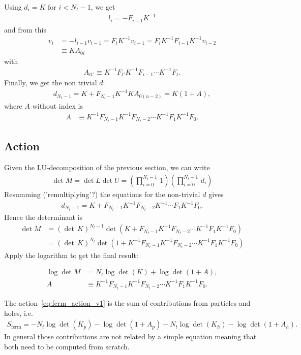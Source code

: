 \documentclass[a4paper, fleqn, twoside, notitlepage]{scrartcl}
\begin{document}
\noindent
Using $d_i = K$ for $i < N_t-1$, we get
\begin{align}
  l_i = - F_{i+1} K^{-1}\label{eq:mlu_l}
\end{align}
and from this
\begin{align}
  v_i &= -l_{i-1}v_{i-1} = F_i K^{-1} v_{i-1} = F_i K^{-1} F_{i-1} K^{-1} v_{i-2}\\
      &\equiv K A_{0i}\label{eq:mlu_v}
\end{align}
with
\begin{align}
  A_{tt'} \equiv K^{-1} F_{t'} K^{-1} F_{i-1} \cdots K^{-1} F_t.\label{eq:def_partial_A}
\end{align}
Finally, we get the non trivial $d$:
\begin{align}
  d_{N_t-1} = K + F_{N_t-1} K^{-1} K A_{0(n-2)} = K (1 + A),
\end{align}
where $A$ without index is
\begin{align}
  A &\equiv K^{-1}F_{N_t-1}K^{-1} F_{N_t-2} \cdots K^{-1}F_{1}K^{-1} F_{0}.\label{eq:def_A}
\end{align}

\subsection{Action}

Given the LU-decomposition of the previous section, we can write
\begin{align}
  \det M = \det L \det U = (\prod_{i=0}^{N_t-1}\,1) (\prod_{i=0}^{N_t-1}\,d_i)
\end{align}
Resumming ('remultiplying'?) the equations for the non-trivial $d$ gives
\begin{align}
  d_{N_t-1} = K + F_{N_t-1}K^{-1} F_{N_t-2}K^{-1} \cdots F_{1}K^{-1} F_{0}.
\end{align}
Hence the determinant is
\begin{align}
  \det M &= {(\det\,K)}^{N_t-1} \det (K + F_{N_t-1}K^{-1} F_{N_t-2} \cdots K^{-1}F_{1}K^{-1} F_{0})\\
         &= {(\det\,K)}^{N_t} \det(1 + K^{-1}F_{N_t-1}K^{-1} F_{N_t-2} \cdots K^{-1}F_{1}K^{-1} F_{0})
\end{align}
Apply the logarithm to get the final result:
\begin{resultbox}
  \vspace{-\baselineskip}
  \begin{align}
    \log \det M &= N_t \log \det(K)  + \log \det (1 + A),\label{eq:det_M}\\
    A &\equiv K^{-1}F_{N_t-1}K^{-1} F_{N_t-2} \cdots K^{-1}F_{1}K^{-1} F_{0}.
  \end{align}
\end{resultbox}
\noindent
The action~\eqref{eq:ferm_action_v1} is the sum of contributions from particles and holes, i.e.
\begin{align}
  S_\text{ferm} = -N_t \log \det(K_p)  - \log \det (1 + A_p) - N_t \log \det(K_h) - \log \det (1 + A_h).
\end{align}
In general those contributions are not related by a simple equation meaning that both need to be computed from scratch.
\end{document}
